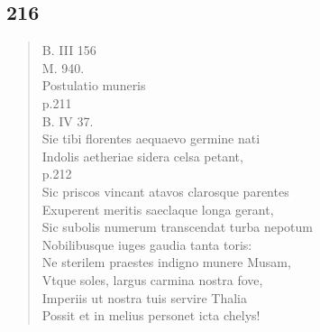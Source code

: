 \documentclass[11pt, a4paper]{report}
\begin{document}
            \subsection*{216}
      \begin{verse}
      B. III 156 \\ M. 940. \\ Postulatio muneris \\ p.211 \\ B. IV 37. \\ Sie tibi florentes aequaevo germine nati \\ Indolis aetheriae sidera celsa petant, \\ p.212 \\ Sic priscos vincant atavos clarosque parentes \\ Exuperent meritis saeclaque longa gerant, \\ Sic subolis numerum transcendat turba nepotum \\ Nobilibusque iuges gaudia tanta toris: \\ Ne sterilem praestes indigno munere Musam, \\ Vtque soles, largus carmina nostra fove, \\ Imperiis ut nostra tuis servire Thalia \\ Possit et in melius personet icta chelys! \\ 
      \end{verse}
  
\end{document}
